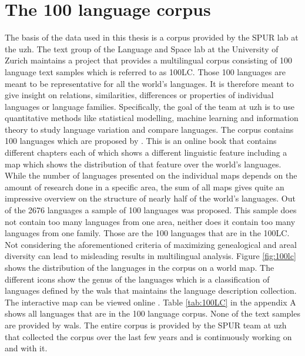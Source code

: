 \section{The 100 language corpus}
\label{sec:corpus}
The basis of the data used in this thesis is a corpus provided by the SPUR lab at the \ac{uzh}. The text group of the Language and Space lab at the University of Zurich maintains a project that provides a multilingual corpus consisting of 100 language text samples \citep{UniversityofZurich.19.07.2021} which is referred to as 100LC. Those 100 languages are meant to be representative for all the world's languages. It is therefore meant to give insight on relations, similarities, differences or properties of individual languages or language families. Specifically, the goal of the team at \ac{uzh} is to use quantitative methods like statistical modelling, machine learning and information theory to study language variation and compare languages. The corpus contains 100 languages which are proposed by \citet{Comrie&Dryer.2013}. This is an online book that contains different chapters each of which shows a different linguistic feature including a map which shows the distribution of that feature over the world's languages. While the number of languages presented on the individual maps depends on the amount of research done in a specific area, the sum of all maps gives quite an impressive overview on the structure of nearly half of the world's languages. Out of the 2676 languages a sample of 100 languages was proposed. This sample does not contain too many languages from one area, neither does it contain too many languages from one family. Those are the 100 languages that are in the 100LC. Not considering the aforementioned criteria of maximizing genealogical and areal diversity can lead to misleading results in multilingual analysis. Figure \ref{fig:100lc} shows the distribution of the languages in the corpus on a world map. The different icons show the genus of the languages which is a classification of languages defined by the \ac{wals} that maintains the language description collection. The interactive map can be viewed online \citep{100LC.21.07.2021}. Table \ref{tab:100LC} in the appendix A shows all languages that are in the 100 language corpus. None of the text samples are provided by \ac{wals}. The entire corpus is provided by the SPUR team at \ac{uzh} that collected the corpus over the last few years and is continuously working on and with it.


